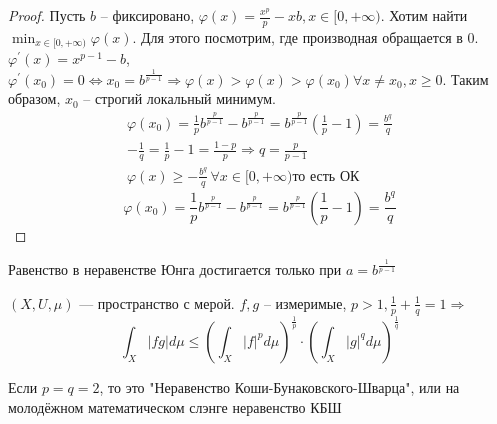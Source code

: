 \documentclass[document]{subfiles}
\begin{document}
\begin{proof}
    Пусть $b$ -- фиксировано, $\varphi(x) = \frac{x^p}{p} - xb, x \in [0, + \infty)$. Хотим найти $\min_{x \in [0, +\infty)} \varphi(x)$. Для этого посмотрим, где производная обращается в 0.
    $\varphi^\prime(x) = x^{p-1} - b$, $\varphi^\prime(x_0) = 0 \Leftrightarrow x_0 = b^{\frac{1}{p-1}} \Rightarrow \varphi(x) > \varphi(x) > \varphi(x_0) \forall x \ne x_0, x \geq 0$.
    Таким образом, $x_0$ -- строгий локальный минимум.
    \begin{gather*}
        \varphi(x_0) = \frac{1}{p} b^{\frac{p}{p-1}} - b^{\frac{p}{p-1}} = b^{\frac{p}{p-1}}\left( \frac{1}{p} -1 \right)  = \frac{b^q}{q}  \\
        -\frac{1}{q} = \frac{1}{p} - 1 = \frac{1-p}{p} \Rightarrow q = \frac{p}{p-1} \\
        \varphi(x) \geq - \frac{b^q}{q} \, \forall x \in [0, + \infty) \text {то есть ОК} 
    \end{gather*}
    \[ \varphi(x_0) = \frac{1}{p} b^{\frac{p}{p-1}} - b^{\frac{p}{p-1}} = b^{\frac{p}{p-1}}\left( \frac{1}{p} -1 \right)  = \frac{b^q}{q} \]
\end{proof}

\begin{remark}
    Равенство в неравенстве Юнга достигается только при $a = b^{\frac{1}{p-1}}$
\end{remark}

\begin{theorem}
    $(X, U, \mu)$ --- пространство с мерой. $f, g$ -- измеримые, $p > 1, \frac{1}{p} + \frac{1}{q} = 1 \Rightarrow$
    \[ \int_X |fg| d\mu \leq \left( \int_X |f|^p d\mu \right)^{\frac{1}{p}} \cdot \left( \int_X |g|^q d\mu \right)^{\frac{1}{q}} \tag{*} \]
\end{theorem}
Если $p=q=2$, то это "Неравенство Коши-Бунаковского-Шварца", или на молодёжном математическом слэнге неравенство КБШ 
\end{document}
